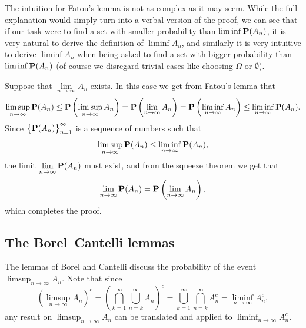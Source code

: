 \documentclass[11pt,a4paper]{article}
\begin{document}
\begin{remark}
  The intuition for Fatou's lemma is not as complex as it may seem.
  While the full explanation would simply turn into a verbal version of
  the proof, we can see that if our task were to find a set with smaller
  probability than $\liminf \mathbf{P}(A_n)$, it is very natural to derive
  the definition of $\liminf A_n$,
  and similarly it is very intuitive to derive $\liminf A_n$
  when being asked to find a set with bigger probability than
  $\liminf \mathbf{P}(A_n)$ (of course we disregard trivial cases like
  choosing $\Omega$ or $\emptyset$).
\end{remark}

\begin{proofof}{}
  Suppose that $\lim\limits_{n \to \infty} A_n$ exists.
  In this case we get from Fatou's lemma that
  \[
    \limsup_{n \to \infty} \mathbf{P}(A_n) \le
    \mathbf{P}\left(\limsup_{n \to \infty} A_n\right) =
    \mathbf{P}\left(\lim_{n \to \infty} A_n\right) =
    \mathbf{P}\left(\liminf_{n \to \infty} A_n\right) \le
    \liminf_{n \to \infty} \mathbf{P}(A_n).
  \]
  Since $\left\{\mathbf{P}(A_n)\right\}_{n = 1}^{\infty}$ is a sequence of
  numbers such that
  \[
    \limsup_{n \to \infty} \mathbf{P}(A_n) \le \liminf_{n \to \infty} \mathbf{P}(A_n),
  \]
  the limit $\lim\limits_{n \to \infty} \mathbf{P}(A_n)$ must exist,
  and from the squeeze theorem we get that
  \[
    \lim_{n \to \infty} \mathbf{P}(A_n) =
    \mathbf{P}\left(\lim_{n \to \infty} A_n\right),
  \]
  which completes the proof.
\end{proofof}

\subsection{The Borel--Cantelli lemmas}
The lemmas of Borel and Cantelli discuss the probability of the
event $\limsup_{n \to \infty} A_n$.
Note that since
\[
  \left( \limsup_{n \to \infty} A_n \right)^c =
  \left(\bigcap_{k=1}^{\infty} \bigcup_{n=k}^{\infty} A_n\right)^c =
  \bigcup_{k=1}^{\infty} \bigcap_{n=k}^{\infty} A_n^c =
  \liminf_{n \to \infty} A_n^c,
\]
any result on $\limsup_{n \to \infty} A_n$ can
be translated and applied to $\liminf_{n \to \infty} A_n^c$.
\end{document}

